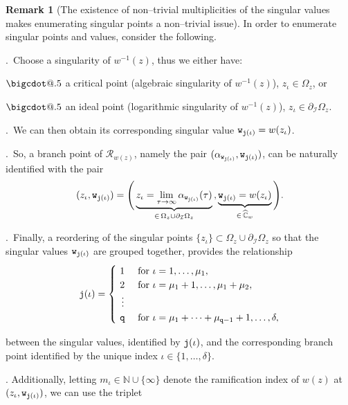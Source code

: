 \documentclass[final,3p,times]{elsarticle}
\makeatletter
\newcommand{\CW}{\ensuremath{{\widehat{\mathbb C}}}}
\newcommand{\NN}{\ensuremath{{\mathbb N}}}
\newcommand{\R}{\ensuremath{{\mathcal R}}}
\newcommand*\bigcdot{\mathpalette\bigcdot@{.5}}
\newcommand*\bigcdot@[2]{\mathbin{\vcenter{\hbox{\scalebox{#2}{$\m@th#1\bullet$}}}}}
\theoremstyle{definition}
\newtheorem{remark}[theorem]{Remark}
\makeatother
\begin{document}
\begin{remark}[The existence of non--trivial multiplicities of the singular values 
makes enumerating singular points a non--trivial issue]
\label{rem:Branch-points-enumeration}
In order to enumerate singular points and values, 
consider the following.

.\ Choose a singularity of $w^{-1}(z)$, thus we either have: 

$\bigcdot$
a critical point (algebraic singularity of $w^{-1}(z)$),
$z_\iota\in\Omega_z$, or 

$\bigcdot$
an ideal point (logarithmic singularity of $w^{-1}(z)$),
$z_\iota\in \partial_{\mathcal{I}} \Omega_z$.

.\ We can then obtain its corresponding singular value ${\tt w}_{{\tt j}(\iota)}=w(z_\iota)$.

.\ So, a branch point of $\R_{w(z)}$, namely the pair 
$(\alpha_{{\tt w}_{{\tt j}(\iota)} }, {\tt w}_{{\tt j}(\iota)})$,
can be naturally identified with the pair
\begin{equation*}
(z_\iota, {\tt w}_{{\tt j}(\iota)} ) =
\Bigg( 
\underbrace{z_\iota = \lim_{\tau \to \infty} \alpha_{{\tt w}_{{\tt j}(\iota)} } 
(\tau ) }_{\in \,\Omega_z \cup \partial_{\mathcal{I}}\Omega_z } \, , 
\underbrace{ {\tt w}_{{\tt j}(\iota)} = w(z_\iota)}_{\in \,\CW_w} 
\Bigg) .
\end{equation*}


.\ Finally, a reordering of the singular points 
$\{ z_\iota \} \subset \Omega_z \cup \partial_{\mathcal{I}}\Omega_z$ 
so that the singular values ${\tt w}_{{\tt j}(\iota)}$ are grouped together, provides 
the relationship
\begin{equation}
{\tt j}(\iota) = \begin{cases}
\ 1 & \text{ for } \iota=1,\ldots,\mu_1, \\
\ 2 & \text{ for } \iota=\mu_1 +1, \ldots, \mu_1 + \mu_2, \\
\ \, \vdots \\
\ {\tt q} & \text{ for } \iota =
\mu_1+ \cdots  +  \mu_{{\tt q}- 1} +
1,\ldots,\delta ,
\end{cases}
\end{equation}

\noindent
between the singular values, identified by ${\tt j}(\iota)$, and the 
corresponding branch point identified by the unique index 
$\iota\in\{1,\ldots,\delta\}$.


.
Additionally, 
letting $m_{\iota} \in \NN \cup \{ \infty\}$ denote the ramification index of $w(z)$ 
at $(z_\iota, {\tt w}_{{\tt j}(\iota)} )$, we can use the triplet


\end{remark}
\end{document}
